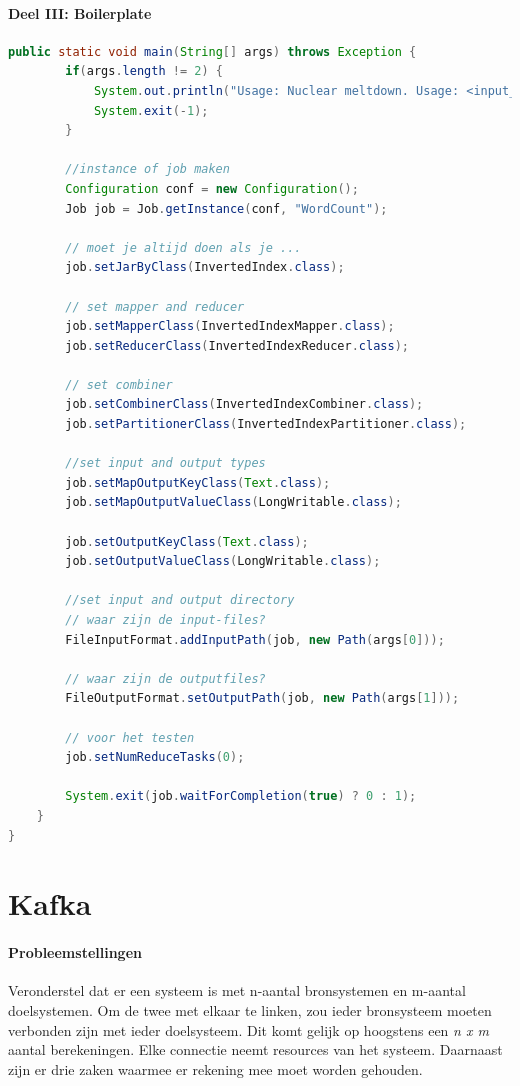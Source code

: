 \documentclass[a4paper,10pt,twoside]{report}
\begin{document}
\subsubsection{Deel III: Boilerplate}
\begin{lstlisting}[language=Java]
	public static void main(String[] args) throws Exception {
		if(args.length != 2) {
			System.out.println("Usage: Nuclear meltdown. Usage: <input_dir> <output_dir>");
			System.exit(-1);
		}
		
		//instance of job maken
		Configuration conf = new Configuration();
		Job job = Job.getInstance(conf, "WordCount");
		
		// moet je altijd doen als je ...
		job.setJarByClass(InvertedIndex.class);
		
		// set mapper and reducer
		job.setMapperClass(InvertedIndexMapper.class);
		job.setReducerClass(InvertedIndexReducer.class);
		
		// set combiner
		job.setCombinerClass(InvertedIndexCombiner.class);
		job.setPartitionerClass(InvertedIndexPartitioner.class);
		
		//set input and output types
		job.setMapOutputKeyClass(Text.class);
		job.setMapOutputValueClass(LongWritable.class);
		
		job.setOutputKeyClass(Text.class);
		job.setOutputValueClass(LongWritable.class);
		
		//set input and output directory
		// waar zijn de input-files?
		FileInputFormat.addInputPath(job, new Path(args[0]));
		
		// waar zijn de outputfiles? 
		FileOutputFormat.setOutputPath(job, new Path(args[1]));
		
		// voor het testen
		job.setNumReduceTasks(0);
		
		System.exit(job.waitForCompletion(true) ? 0 : 1);		
	}
}
\end{lstlisting}

\chapter{Kafka}

\subsubsection{Probleemstellingen}

Veronderstel dat er een systeem is met n-aantal bronsystemen en m-aantal doelsystemen. Om de twee met elkaar te linken, zou ieder bronsysteem moeten verbonden zijn met ieder doelsysteem. Dit komt gelijk op hoogstens een \textit{n x m} aantal berekeningen. Elke connectie neemt resources van het systeem. Daarnaast zijn er drie zaken waarmee er rekening mee moet worden gehouden.
\end{document}

